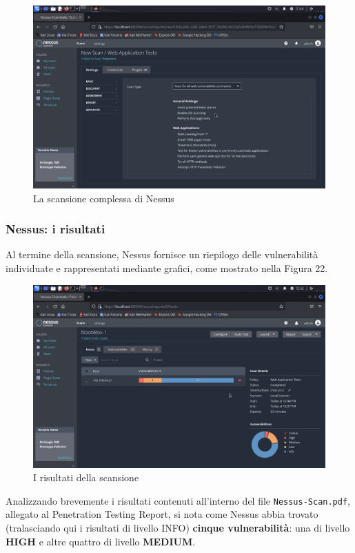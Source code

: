 \documentclass[a4paper, 12pt, oneside]{article}
\begin{document}
\begin{figure}[h!]
    \centering
    \includegraphics[width=\textwidth]{img/nessus-complex-scan.png}
    \caption{La scansione complessa di Nessus}
\end{figure}

\newpage
\subsubsection{Nessus: i risultati}
Al termine della scansione, Nessus fornisce un riepilogo delle vulnerabilità individuate e rappresentati mediante grafici, come mostrato nella Figura 22.

\begin{figure}[h!]
    \centering
    \includegraphics[width=\textwidth]{img/nessus-results.png}
    \caption{I risultati della scansione}
\end{figure}

Analizzando brevemente i risultati contenuti all'interno del file \texttt{Nessus-Scan.pdf}, allegato al Penetration Testing Report, si nota come Nessus abbia trovato (tralasciando qui i risultati di livello INFO) \textbf{cinque vulnerabilità}: una di livello \textbf{HIGH} e altre quattro di livello \textbf{MEDIUM}.
\end{document}

